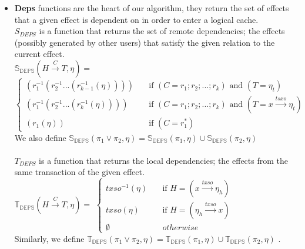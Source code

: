 \begin{itemize}
\item {\bf Deps} functions are the heart of our algorithm, they return the set of effects that a given effect is dependent on in order to enter a logical cache. \\
$S_{DEPS}$ is a function that returns the set of remote dependencies; the effects (possibly generated by other users) that satisfy the given relation to the current effect. \\
$\mathds{S_{DEPS}} (H\xrightarrow{C}T,\eta) = $ 
$ \begin{cases}
(r_1^{-1}(r_2^{-1}...(r_{k-1}^{-1}(\eta)))) &\quad \text{if } (C = r_1;r_2;...;r_k) \text{ and } (T=\eta_t)\\ 
(r_1^{-1}(r_2^{-1}...(r_{k}^{-1}(\eta)))) &\quad \text{if } (C = r_1;r_2;...;r_k) \text{ and } (T=x \xrightarrow{tsxo}\eta_t) \\
(r_1(\eta)) &\quad \text{if } (C = r_1^*) 
\end{cases}$ \\
We also define $\mathds{S_{DEPS}} (\pi_1 \vee \pi_2 ,\eta) = \mathds{S_{DEPS}}(\pi_1,\eta) \cup \mathds{S_{DEPS}}(\pi_2,\eta)$ 
\\ \\
$T_{DEPS}$ is a function that returns the local dependencies; the effects from the same transaction of the given effect. \\
$\mathds{T_{DEPS}} (H\xrightarrow{C}T,\eta) =  $ 
$ \begin{cases}
txso ^{-1} (\eta)&\quad  \text{if } H = (x \xrightarrow{txso}\eta_h)\\ 
txso  (\eta) &\quad  \text{if } H = (\eta_{h} \xrightarrow{txso}x) \\
\emptyset &\quad otherwise
\end{cases}$ \\
Similarly, we define $\mathds{T_{DEPS}} (\pi_1\vee\pi_2,\eta) =   \mathds{T_{DEPS}}(\pi_1,\eta) \cup \mathds{T_{DEPS}}(\pi_2,\eta)$ .

\end{itemize}
